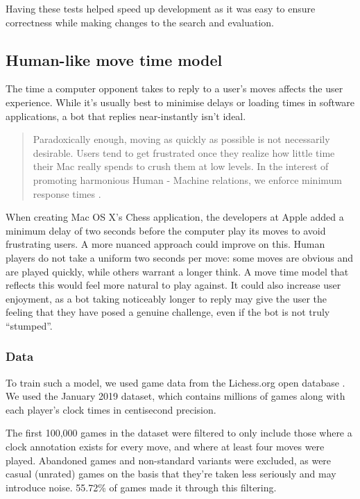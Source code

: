 \documentclass[12pt,titlepage,a4paper]{article}
\begin{document}
    Having these tests helped speed up development as it was easy to ensure correctness while making changes to the search and evaluation.

    \subsection{Human-like move time model}
    \label{Human-like move time model}

    The time a computer opponent takes to reply to a user's moves affects the user experience. While it's usually best to minimise delays or loading times in software applications, a bot that replies near-instantly isn't ideal.

    \begin{quotation}
        Paradoxically enough, moving as quickly as possible is not necessarily desirable. Users tend to get frustrated once they realize how little time their Mac really spends to crush them at low levels. In the interest of promoting harmonious Human - Machine relations, we enforce minimum response times \citep{apple-chess-engine}.
    \end{quotation}

    When creating Mac OS X's Chess application, the developers at Apple added a minimum delay of two seconds before the computer play its moves to avoid frustrating users. A more nuanced approach could improve on this. Human players do not take a uniform two seconds per move: some moves are obvious and are played quickly, while others warrant a longer think. A move time model that reflects this would feel more natural to play against. It could also increase user enjoyment, as a bot taking noticeably longer to reply may give the user the feeling that they have posed a genuine challenge, even if the bot is not truly ``stumped''.

    \subsubsection{Data}

    To train such a model, we used game data from the Lichess.org open database
    \citep{lichess-db-univ}. We used the January 2019 dataset, which contains millions of games along with each player's clock times in centisecond precision.

    The first 100,000 games in the dataset were filtered to only include those where a clock annotation exists for every move, and where at least four moves were played. Abandoned games and non-standard variants were excluded, as were casual (unrated) games on the basis that they're taken less seriously and may introduce noise. 55.72\% of games made it through this filtering.
\end{document}
